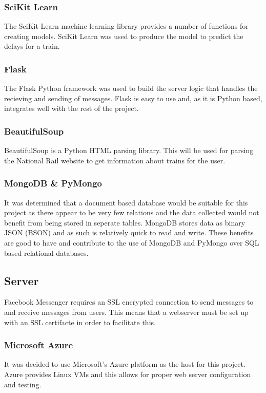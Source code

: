 \documentclass[12pt,a4paper]{article}
\begin{document}
    \subsubsection{SciKit Learn}
    The SciKit Learn machine learning library provides a number of functions for creating models. SciKit Learn was used to produce the model to predict the delays for a train.
    
    \subsubsection{Flask}
    The Flask Python framework was used to build the server logic that handles the recieving and sending of messages. Flask is easy to use and, as it is Python based, integrates well with the rest of the project.
    
    \subsubsection{BeautifulSoup}
    \label{subsubsection:BeautifulSoup}
    BeautifulSoup is a Python HTML parsing library. This will be used for parsing the National Rail website to get information about trains for the user.
    
    \subsubsection{MongoDB \& PyMongo}
    \label{subsubsection:mongodb}
    It was determined that a document based database would be suitable for this project as there appear to be very few relations and the data collected would not benefit from being stored in seperate tables. MongoDB stores data as binary JSON (BSON) \citep{korneliusz_2014} and as such is relatively quick to read and write. These benefits are good to have and contribute to the use of MongoDB and PyMongo over SQL based relational databases.
    
    \subsection{Server}
    \label{subsection:Server}
    Facebook Messenger requires an SSL encrypted connection to send messages to and receive messages from users. This means that a webserver must be set up with an SSL certifacte in order to facilitate this.
    \subsubsection{Microsoft Azure}
    It was decided to use Microsoft's Azure platform as the host for this project. Azure provides Linux VMs and this allows for proper web server configuration and testing.
    
\end{document}
